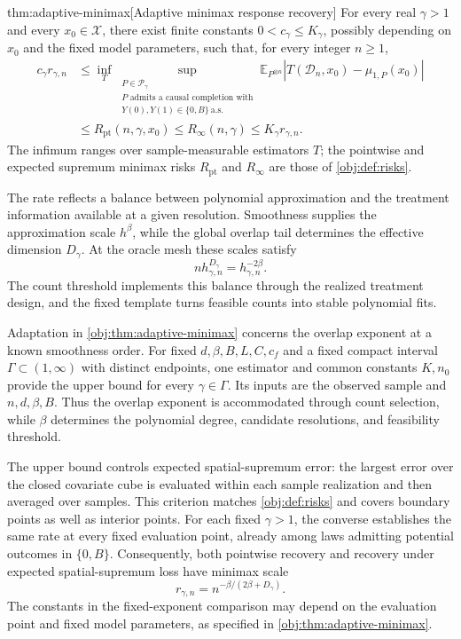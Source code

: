 \documentclass[11pt]{article}
\begin{document}
\begin{theoremv}{thm:adaptive-minimax}[Adaptive minimax response recovery]
For every real \(\gamma>1\) and every \(x_0\in\mathcal X\), there exist finite constants \(0<c_\gamma\le K_\gamma\), possibly depending on \(x_0\) and the fixed model parameters, such that, for every integer \(n\ge1\),
\[
\begin{aligned}
c_\gamma r_{\gamma,n}
&\le
\inf_T
\sup_{\substack{P\in\mathcal P_\gamma\\
P\text{ admits a causal completion with}\\
Y(0),Y(1)\in\{0,B\}\ \text{a.s.}}}
\mathbb E_{P^{\otimes n}}
\left|T(\mathcal D_n,x_0)-\mu_{1,P}(x_0)\right|
\\
&\le R_{\mathrm{pt}}(n,\gamma,x_0)
\le R_\infty(n,\gamma)
\le K_\gamma r_{\gamma,n}.
\end{aligned}
\]
The infimum ranges over sample-measurable estimators \(T\); the pointwise and expected supremum minimax risks \(R_{\mathrm{pt}}\) and \(R_\infty\) are those of \cref{obj:def:risks}.
\end{theoremv}

The rate reflects a balance between polynomial approximation and the treatment information available at a given resolution. Smoothness supplies the approximation scale \(h^\beta\), while the global overlap tail determines the effective dimension \(D_\gamma\). At the oracle mesh these scales satisfy
\[
n h_{\gamma,n}^{D_\gamma}
=
h_{\gamma,n}^{-2\beta}.
\]
The count threshold implements this balance through the realized treatment design, and the fixed template turns feasible counts into stable polynomial fits.

Adaptation in \cref{obj:thm:adaptive-minimax} concerns the overlap exponent at a known smoothness order. For fixed \(d,\beta,B,L,C,c_f\) and a fixed compact interval \(\Gamma\subset(1,\infty)\) with distinct endpoints, one estimator and common constants \(K,n_0\) provide the upper bound for every \(\gamma\in\Gamma\). Its inputs are the observed sample and \(n,d,\beta,B\). Thus the overlap exponent is accommodated through count selection, while \(\beta\) determines the polynomial degree, candidate resolutions, and feasibility threshold.

The upper bound controls expected spatial-supremum error: the largest error over the closed covariate cube is evaluated within each sample realization and then averaged over samples. This criterion matches \cref{obj:def:risks} and covers boundary points as well as interior points. For each fixed \(\gamma>1\), the converse establishes the same rate at every fixed evaluation point, already among laws admitting potential outcomes in \(\{0,B\}\). Consequently, both pointwise recovery and recovery under expected spatial-supremum loss have minimax scale
\[
r_{\gamma,n}
=
n^{-\beta/(2\beta+D_\gamma)}.
\]
The constants in the fixed-exponent comparison may depend on the evaluation point and fixed model parameters, as specified in \cref{obj:thm:adaptive-minimax}.
\end{document}
